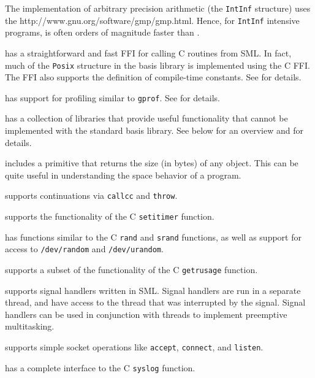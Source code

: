 \begin{description}
The {\mlton} implementation of arbitrary precision arithmetic (the
{\tt IntInf} structure) uses the
		  {http://www.gnu.org/software/gmp/gmp.html}.
Hence, for {\tt IntInf} intensive programs, {\mlton} is often orders
of magnitude faster than {\smlnj}.

{\mlton} has a straightforward and fast FFI for calling C routines
from SML.  In fact, much of the {\tt Posix} structure in the basis library is
implemented using the C FFI.  The FFI also supports the definition of
compile-time constants.  See  for details.

{\mlton} has support for profiling similar to {\tt gprof}.  See
 for details.

{\mlton} has a collection of libraries that provide useful functionality that
cannot be implemented with the standard basis library.  See below for an
overview and  for details.

\begin{description}

{\mlton} includes a primitive that returns the size (in bytes) of any
object.  This can be quite useful in understanding the space behavior
of a program.

{\mlton} supports continuations via {\tt callcc} and {\tt throw}.

{\mlton} supports the functionality of the C {\tt setitimer} function.

{\mlton} has functions similar to the C {\tt rand} and {\tt srand} functions, as
well as support for access to {\tt /dev/random} and {\tt /dev/urandom}.

{\mlton} supports a subset of the functionality of the C {\tt getrusage}
function.

{\mlton} supports signal handlers written in SML.  Signal handlers are 
run in a separate thread, and have access to the thread that was
interrupted by the signal.  Signal handlers can be used in conjunction with
threads to implement preemptive multitasking.

{\mlton} supports simple socket operations like {\tt accept}, 
{\tt connect}, and {\tt listen}.

{\mlton} has a complete interface to the C {\tt syslog} function.


\end{description}
\end{description}
